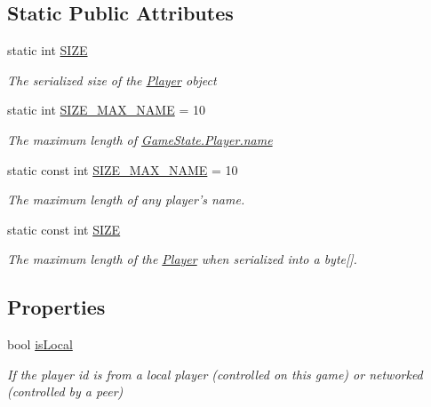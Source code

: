 \subsection*{Static Public Attributes}
\begin{DoxyCompactItemize}
\item 
static int \hyperlink{class_game_state_1_1_player_ada2d068d3d5f973f73abac805c162d17}{S\-I\-Z\-E}
\begin{DoxyCompactList}\small\item\em The serialized size of the \hyperlink{class_game_state_1_1_player}{Player} object \end{DoxyCompactList}\item 
static int \hyperlink{class_game_state_1_1_player_a1cdc9de8183b220e87632f7f6a7147d0}{S\-I\-Z\-E\-\_\-\-M\-A\-X\-\_\-\-N\-A\-M\-E} = 10
\begin{DoxyCompactList}\small\item\em The maximum length of \hyperlink{class_game_state_1_1_player_afc2b145df544ca5bffc7c87ef294bcde}{Game\-State.\-Player.\-name} \end{DoxyCompactList}\item 
\hypertarget{class_game_state_1_1_player_a16d0264ca6adfedb582e22f59a550fc5}{static const int \hyperlink{class_game_state_1_1_player_a16d0264ca6adfedb582e22f59a550fc5}{S\-I\-Z\-E\-\_\-\-M\-A\-X\-\_\-\-N\-A\-M\-E} = 10}\label{class_game_state_1_1_player_a16d0264ca6adfedb582e22f59a550fc5}

\begin{DoxyCompactList}\small\item\em The maximum length of any player's name. \end{DoxyCompactList}\item 
static const int \hyperlink{class_game_state_1_1_player_a07b452f69128e1f3f6d3bb575c2976f1}{S\-I\-Z\-E}
\begin{DoxyCompactList}\small\item\em The maximum length of the \hyperlink{class_game_state_1_1_player}{Player} when serialized into a byte\mbox{[}\mbox{]}. \end{DoxyCompactList}\end{DoxyCompactItemize}
\subsection*{Properties}
\begin{DoxyCompactItemize}
\item 
bool \hyperlink{class_game_state_1_1_player_affd7c601a6d763dafdc59a58c415e9e7}{is\-Local}
\begin{DoxyCompactList}\small\item\em If the player id is from a local player (controlled on this game) or networked (controlled by a peer) \end{DoxyCompactList}\end{DoxyCompactItemize}


